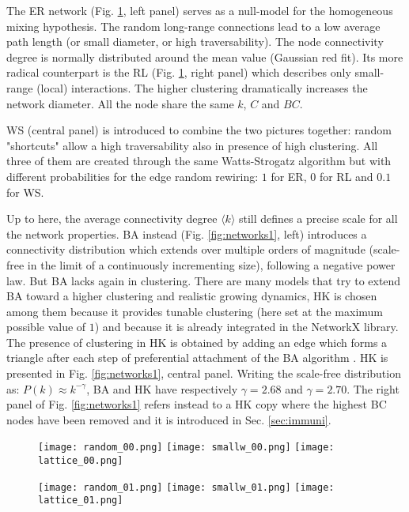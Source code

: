 \documentclass[DIV=12, BCOR=0pt]{scrartcl}  %
\begin{document}
  The ER network (Fig. \ref{fig:networks0}, left panel) serves as a null-model for the homogeneous mixing hypothesis. The random long-range connections lead to a low average path length (or small diameter, or high traversability). The node connectivity degree is normally distributed around the mean value (Gaussian red fit). 
  Its more radical counterpart is the RL (Fig. \ref{fig:networks0}, right panel) which describes only small-range (local) interactions. The higher clustering dramatically increases the network diameter. All the node share the same $k$, $C$ and $BC$.
  
  WS (central panel) is introduced to combine the two pictures together: random "shortcuts" allow a high traversability also in presence of high clustering. All three of them are created through the same Watts-Strogatz algorithm but with different probabilities for the edge random rewiring: $1$ for ER, $0$ for RL and $0.1$ for WS.

    
  Up to here, the average connectivity degree $\langle k \rangle$ still defines a precise scale for all the network properties. BA instead (Fig. \ref{fig:networks1}, left) introduces a connectivity distribution which extends over multiple orders of magnitude (scale-free in the limit of a continuously incrementing size), following a negative power law. But BA lacks again in clustering. 
  There are many models that try to extend BA toward a higher clustering and realistic growing dynamics, HK is chosen among them because it provides tunable clustering (here set at the maximum possible value of $1$) and because it is already integrated in the NetworkX library. The presence of clustering in HK is obtained by adding an edge which forms a triangle after each step of preferential attachment of the BA algorithm \citep{Holme}.
  HK is presented in Fig. \ref{fig:networks1}, central panel. Writing the scale-free distribution as: $P(k) \approx k^{- \gamma}$, BA and HK have respectively $\gamma = 2.68$ and $\gamma = 2.70$.
  The right panel of Fig. \ref{fig:networks1} refers instead to a HK copy where the highest BC nodes have been removed and it is introduced in Sec. \ref{sec:immuni}.

     
  \clearpage
  \begin{figure}[h!]
  	\centering
  	\texttt{[image: random\_00.png]}
  	\texttt{[image: smallw\_00.png]}
  	\texttt{[image: lattice\_00.png]}
  	
  	\texttt{[image: random\_01.png]}
  	\texttt{[image: smallw\_01.png]}
  	\texttt{[image: lattice\_01.png]}
  	\caption{ }
  	\label{fig:networks0}
  \end{figure}  	
  
\end{document}

